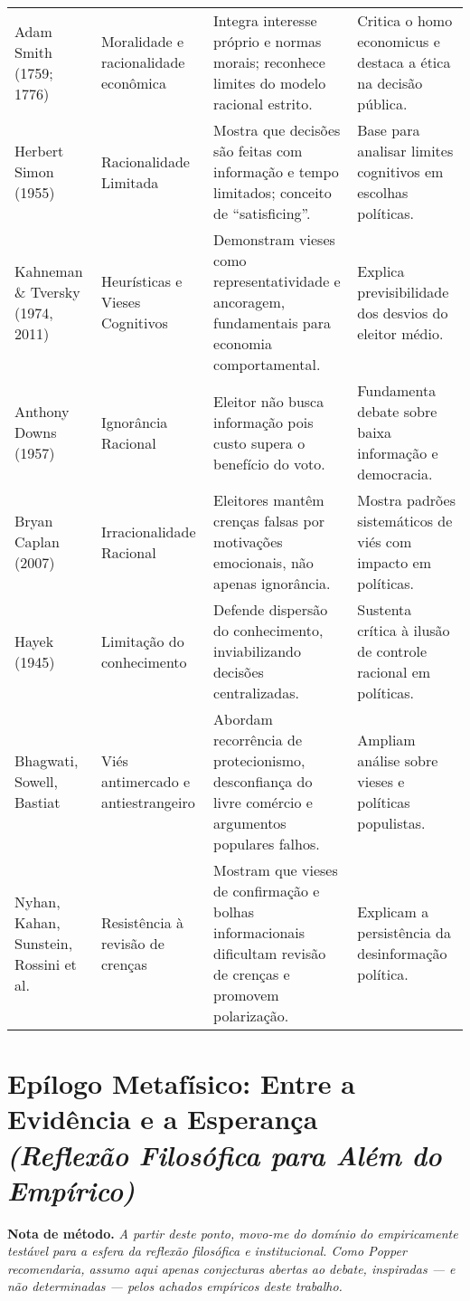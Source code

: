 \begin{apendicesenv}
\begin{quadro}[htbp]
\begin{longtable}{p{} p{} p{} p{}}
Adam Smith (1759; 1776) & Moralidade e racionalidade econômica & Integra interesse próprio e normas morais; reconhece limites do modelo racional estrito. & Critica o homo economicus e destaca a ética na decisão pública. \\
Herbert Simon (1955) & Racionalidade Limitada & Mostra que decisões são feitas com informação e tempo limitados; conceito de “satisficing”. & Base para analisar limites cognitivos em escolhas políticas. \\
Kahneman \& Tversky (1974, 2011) & Heurísticas e Vieses Cognitivos & Demonstram vieses como representatividade e ancoragem, fundamentais para economia comportamental. & Explica previsibilidade dos desvios do eleitor médio. \\
Anthony Downs (1957) & Ignorância Racional & Eleitor não busca informação pois custo supera o benefício do voto. & Fundamenta debate sobre baixa informação e democracia. \\
Bryan Caplan (2007) & Irracionalidade Racional & Eleitores mantêm crenças falsas por motivações emocionais, não apenas ignorância. & Mostra padrões sistemáticos de viés com impacto em políticas. \\
Hayek (1945) & Limitação do conhecimento & Defende dispersão do conhecimento, inviabilizando decisões centralizadas. & Sustenta crítica à ilusão de controle racional em políticas. \\
Bhagwati, Sowell, Bastiat & Viés antimercado e antiestrangeiro & Abordam recorrência de protecionismo, desconfiança do livre comércio e argumentos populares falhos. & Ampliam análise sobre vieses e políticas populistas. \\
Nyhan, Kahan, Sunstein, Rossini et al. & Resistência à revisão de crenças & Mostram que vieses de confirmação e bolhas informacionais dificultam revisão de crenças e promovem polarização. & Explicam a persistência da desinformação política. \\
\bottomrule
\end{longtable}
\end{quadro}

\chapter{Epílogo Metafísico: Entre a Evidência e a Esperança \\ \smallskip \textit{(Reflexão Filosófica para Além do Empírico)}}

\noindent
\textbf{Nota de método.} \textit{A partir deste ponto, movo-me do domínio do empiricamente testável para a esfera da reflexão filosófica e institucional. Como Popper recomendaria, assumo aqui apenas conjecturas abertas ao debate, inspiradas — e não determinadas — pelos achados empíricos deste trabalho.}


\end{apendicesenv}
